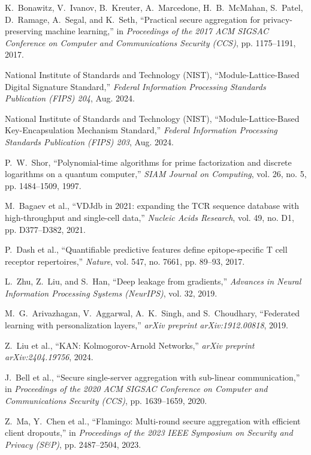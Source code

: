 \documentclass[11pt,a4paper]{report}
\begin{document}
\begin{enumerate}[label={[\arabic*]},itemsep=4pt]
  \item K.~Bonawitz, V.~Ivanov, B.~Kreuter, A.~Marcedone, H.~B.~McMahan, S.~Patel, D.~Ramage, A.~Segal, and K.~Seth, ``Practical secure aggregation for privacy-preserving machine learning,'' in \emph{Proceedings of the 2017 ACM SIGSAC Conference on Computer and Communications Security (CCS)}, pp. 1175--1191, 2017.
  \item National Institute of Standards and Technology (NIST), ``Module-Lattice-Based Digital Signature Standard,'' \emph{Federal Information Processing Standards Publication (FIPS) 204}, Aug. 2024.
  \item National Institute of Standards and Technology (NIST), ``Module-Lattice-Based Key-Encapsulation Mechanism Standard,'' \emph{Federal Information Processing Standards Publication (FIPS) 203}, Aug. 2024.
  \item P.~W.~Shor, ``Polynomial-time algorithms for prime factorization and discrete logarithms on a quantum computer,'' \emph{SIAM Journal on Computing}, vol. 26, no. 5, pp. 1484--1509, 1997.
  \item M.~Bagaev et al., ``VDJdb in 2021: expanding the TCR sequence database with high-throughput and single-cell data,'' \emph{Nucleic Acids Research}, vol. 49, no. D1, pp. D377--D382, 2021.
  \item P.~Dash et al., ``Quantifiable predictive features define epitope-specific T cell receptor repertoires,'' \emph{Nature}, vol. 547, no. 7661, pp. 89--93, 2017.
  \item L.~Zhu, Z.~Liu, and S.~Han, ``Deep leakage from gradients,'' \emph{Advances in Neural Information Processing Systems (NeurIPS)}, vol. 32, 2019.
  \item M.~G.~Arivazhagan, V.~Aggarwal, A.~K.~Singh, and S.~Choudhary, ``Federated learning with personalization layers,'' \emph{arXiv preprint arXiv:1912.00818}, 2019.
  \item Z.~Liu et al., ``KAN: Kolmogorov-Arnold Networks,'' \emph{arXiv preprint arXiv:2404.19756}, 2024.
  \item J.~Bell et al., ``Secure single-server aggregation with sub-linear communication,'' in \emph{Proceedings of the 2020 ACM SIGSAC Conference on Computer and Communications Security (CCS)}, pp. 1639--1659, 2020.
  \item Z.~Ma, Y.~Chen et al., ``Flamingo: Multi-round secure aggregation with efficient client dropouts,'' in \emph{Proceedings of the 2023 IEEE Symposium on Security and Privacy (S\&P)}, pp. 2487--2504, 2023.

\end{enumerate}
\end{document}

